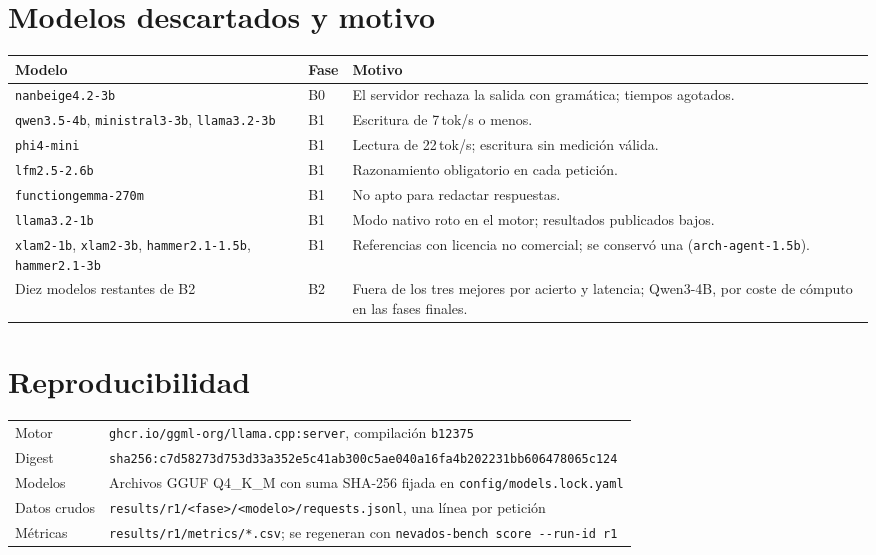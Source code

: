 \documentclass[11pt,a4paper]{article}
\newcommand{\m}[1]{\texttt{#1}}
\begin{document}
\appendix
\section{Modelos descartados y motivo}

\begin{table}[H]
\centering\small
\begin{tabularx}{\textwidth}{@{}>{\raggedright\arraybackslash}p{}lL@{}}
\toprule
Modelo & Fase & Motivo\\
\midrule
\m{nanbeige4.2-3b} & B0 & El servidor rechaza la salida con gramática; tiempos agotados.\\
\m{qwen3.5-4b}, \m{ministral3-3b}, \m{llama3.2-3b} & B1 & Escritura de 7\,tok/s o menos.\\
\m{phi4-mini} & B1 & Lectura de 22\,tok/s; escritura sin medición válida.\\
\m{lfm2.5-2.6b} & B1 & Razonamiento obligatorio en cada petición.\\
\m{functiongemma-270m} & B1 & No apto para redactar respuestas.\\
\m{llama3.2-1b} & B1 & Modo nativo roto en el motor; resultados publicados bajos.\\
\m{xlam2-1b}, \m{xlam2-3b}, \m{hammer2.1-1.5b}, \m{hammer2.1-3b} & B1 & Referencias con licencia no comercial; se conservó una (\m{arch-agent-1.5b}).\\
Diez modelos restantes de B2 & B2 & Fuera de los tres mejores por acierto y latencia; Qwen3-4B, por coste de cómputo en las fases finales.\\
\bottomrule
\end{tabularx}
\end{table}

\section{Reproducibilidad}

\begin{tabularx}{\textwidth}{@{}lL@{}}
\toprule
Motor & \m{ghcr.io/ggml-org/llama.cpp:server}, compilación \m{b12375}\\
Digest & {\footnotesize\m{sha256:c7d58273d753d33a352e5c41ab300c5ae040a16fa4b202231bb606478065c124}}\\
Modelos & Archivos GGUF Q4\_K\_M con suma SHA-256 fijada en \m{config/models.lock.yaml}\\
Datos crudos & \m{results/r1/<fase>/<modelo>/requests.jsonl}, una línea por petición\\
Métricas & \m{results/r1/metrics/*.csv}; se regeneran con \m{nevados-bench score -{}-run-id r1}\\
\bottomrule
\end{tabularx}
\end{document}
